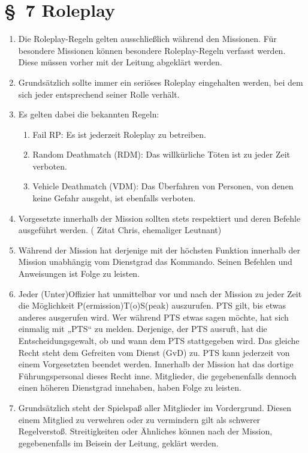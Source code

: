 \section*{\S~7 Roleplay} 
\label{sec:roleplay}

\begin{enumerate}[label=(\arabic*)]
    \item Die Roleplay-Regeln gelten ausschließlich während den Missionen. Für besondere Missionen können besondere Roleplay-Regeln verfasst werden. Diese müssen vorher mit der Leitung abgeklärt werden.   
    \item Grundsätzlich sollte immer ein seriöses Roleplay eingehalten werden, bei dem sich jeder entsprechend seiner Rolle verhält.    
    \item Es gelten dabei die bekannten Regeln:
    \begin{enumerate}[label=(\Alph*)]
        \item Fail RP: Es ist jederzeit Roleplay zu betreiben.
        \item Random Deathmatch (RDM): Das willkürliche Töten ist zu jeder Zeit verboten.
        \item Vehicle Deathmatch (VDM): Das Überfahren von Personen, von denen keine Gefahr ausgeht, ist ebenfalls verboten.
    \end{enumerate}    
    \item Vorgesetzte innerhalb der Mission sollten stets respektiert und deren Befehle ausgeführt werden. ( Zitat Chris, ehemaliger Leutnant)    
    \item Während der Mission hat derjenige mit der höchsten Funktion innerhalb der Mission unabhängig vom Dienstgrad das Kommando. Seinen Befehlen und Anweisungen ist Folge zu leisten.    
    \item Jeder (Unter)Offizier hat unmittelbar vor und nach der Mission zu jeder Zeit die Möglichkeit P(ermission)T(o)S(peak) auszurufen. PTS gilt, bis etwas anderes ausgerufen wird. Wer während PTS etwas sagen möchte, hat sich einmalig mit „PTS“ zu melden. Derjenige, der PTS ausruft, hat die Entscheidungsgewalt, ob und wann dem PTS stattgegeben wird. Das gleiche Recht steht dem Gefreiten vom Dienst (GvD) zu. PTS kann jederzeit von einem Vorgesetzten beendet werden. Innerhalb der Mission hat das dortige Führungspersonal dieses Recht inne. Mitglieder, die gegebenenfalls dennoch einen höheren Dienstgrad innehaben, haben Folge zu leisten.    
    \item Grundsätzlich steht der Spielspaß aller Mitglieder im Vordergrund. Diesen einem Mitglied zu verwehren oder zu vermindern gilt als schwerer Regelverstoß. Streitigkeiten oder Ähnliches können nach der Mission, gegebenenfalls im Beisein der Leitung, geklärt werden.
\end{enumerate}
